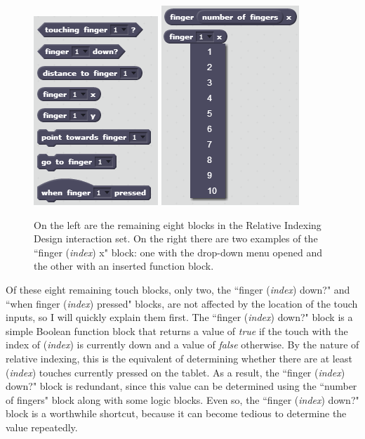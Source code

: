 \begin{figure}
\centering
\includegraphics{images/Relative_Indexing_Design_Block_Set.PNG}
\includegraphics{images/Relative_Indexing_Design_Block_Dropdown_Show.PNG}
\caption[Remaining Eight Blocks in the Relative Indexing Design Interaction Set]{On the left are the remaining eight blocks in the Relative Indexing Design interaction set.  On the right there are two examples of the ``finger (\emph{index}) x" block: one with the drop-down menu opened and the other with an inserted function block.}
\label{Relative_Indexing_Design_Block_Set}
\end{figure}

Of these eight remaining touch blocks, only two, the ``finger (\emph{index}) down?" and ``when finger (\emph{index}) pressed" blocks, are not affected by the location of the touch inputs, so I will quickly explain them first. The ``finger (\emph{index}) down?" block is a simple Boolean function block that returns a value of \emph{true} if the touch with the index of (\emph{index}) is currently down and a value of \emph{false} otherwise. By the nature of relative indexing, this is the equivalent of determining whether
there are at least (\emph{index}) touches currently pressed on the tablet. As a result, the ``finger (\emph{index}) down?" block is redundant, since this value can be determined using the ``number of fingers" block along with some logic blocks. Even so, the ``finger (\emph{index}) down?" block is a worthwhile shortcut, because it can become tedious to determine the value repeatedly.

